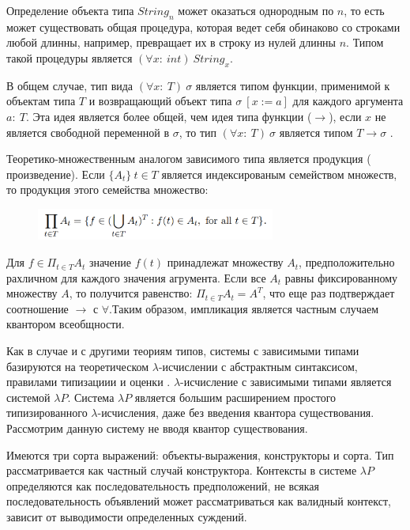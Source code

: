 Определение объекта типа $String_{n}$ может оказаться однородным по $n$, то 
есть может существовать общая процедура, которая ведет себя обинаково со 
строками любой длинны, например, превращает их в строку из нулей длинны $n$. 
Типом такой процедуры является $(\forall x: \ int) \ String_{x}$\cite{lectures, ml}.

В общем случае, тип вида $(\forall x: \ T) \ \sigma$ является типом функции, 
применимой к объектам типа $T$ и возвращающий объект типа $\sigma \ [x:=a]$ 
для каждого аргумента $a: \ T$. Эта идея является более общей, чем идея типа 
функции ($\rightarrow$), если $x$ не является свободной переменной в $\sigma$, то тип $(\forall x: \ T) \ \sigma$ является типом $T \rightarrow \sigma$ \cite{lectures, hofmanndt}.

Теоретико-множественным аналогом зависимого типа является продукция (
произведение). Если $\{A_{t}\} \ t \in T$ является индексированым семейством 
множеств, то продукция этого семейства множество:
\begin{figure}[ht]
	\centering
		\includegraphics[width=0.70\textwidth]{img/set.png}
	\label{fig:set}
\end{figure}

Для $f \in \Pi_{t \in T} A _{t}$ значение $f(t)$ принадлежат множеству $A _{
t}$, предположительно рахличном для каждого значения агрумента. Если все $A _{
t}$ равны фиксированному множеству $A$, то получится равенство: $\Pi_{t \in 
T} A_{t} = A ^{T}$, что еще раз подтверждает соотношение $\rightarrow$ с $
\forall$.Таким образом, импликация является частным случаем квантором всеобщности.

Как в случае и с другими теориям типов, системы с зависимыми типами 
базируются на теоретическом $\lambda$-исчислении с абстрактным синтаксисом, 
правилами типизациии и оценки \cite{ml, hofmanndt}. $\lambda$-исчисление с 
зависимыми типами является системой $\lambda P$. Система $\lambda P$
является большим расширением простого типизированного $\lambda$-исчисления, 
даже без введения квантора существования. Рассмотрим данную систему не вводя 
квантор существования\cite{lectures}.

Имеются три сорта выражений: объекты-выражения, конструкторы и сорта. Тип 
рассматривается как частный случай конструктора. Контексты в системе $\lambda 
P$ определяются как последовательность предположений, не всякая 
последовательность объявлений может рассматриваться как валидный контекст, 
зависит от выводимости определенных суждений. 

